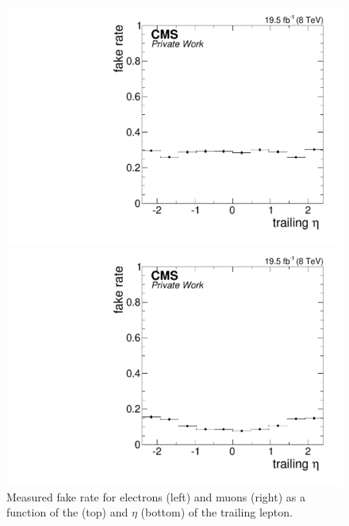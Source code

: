 \begin{figure}[htbp]
\begin{minipage}[t]{0.49\textwidth}
\includegraphics[width=\textwidth]{plots/BG/nonPrompt/fakeRate_ele_Inclusive_Full2012_TrailingEta_None.pdf}
\end{minipage}
\begin{minipage}[t]{0.49\textwidth}
\includegraphics[width=\textwidth]{plots/BG/nonPrompt/fakeRate_mu_Inclusive_Full2012_TrailingEta_None.pdf}
\end{minipage}
\caption{Measured fake rate for electrons (left) and muons (right) as a function of the \pt (top) and $\eta$ (bottom) of the trailing lepton.}
\label{fig:fakeRate}
\end{figure} 

